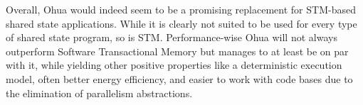 Overall, Ohua would indeed seem to be a promising replacement for STM-based shared state applications.
While it is clearly not suited to be used for every type of shared state program, so is STM.
Performance-wise Ohua will not always outperform Software Transactional Memory but manages to at least be on par with it, while yielding other positive properties like a deterministic execution model, often better energy efficiency, and easier to work with code bases due to the elimination of parallelism abstractions.

